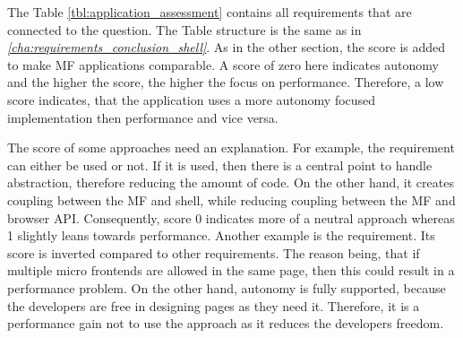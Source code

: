 The Table \ref{tbl:application_assessment} contains all requirements that are connected to the question.
The Table structure is the same as in \textit{\ref{cha:requirements_conclusion_shell}}.
As in the other section, the score is added to make \ac{MF} applications comparable.
A score of zero here indicates autonomy and the higher the score, the higher the focus on performance.
Therefore, a low score indicates, that the application uses a more autonomy focused implementation then performance and vice versa.

The score of some approaches need an explanation.
For example, the \textit{} requirement can either be used or not.
If it is used, then there is a central point to handle abstraction, therefore reducing the amount of code.
On the other hand, it creates coupling between the \ac{MF} and shell, while reducing coupling between the \ac{MF} and browser \ac{API}.
Consequently, score 0 indicates more of a neutral approach whereas 1 slightly leans towards performance.
Another example is the \textit{} requirement.
Its score is inverted compared to other requirements.
The reason being, that if multiple micro frontends are allowed in the same page, then this could result in a performance problem.
On the other hand, autonomy is fully supported, because the developers are free in designing pages as they need it.
Therefore, it is a performance gain not to use the \textit{} approach as it reduces the developers freedom.


